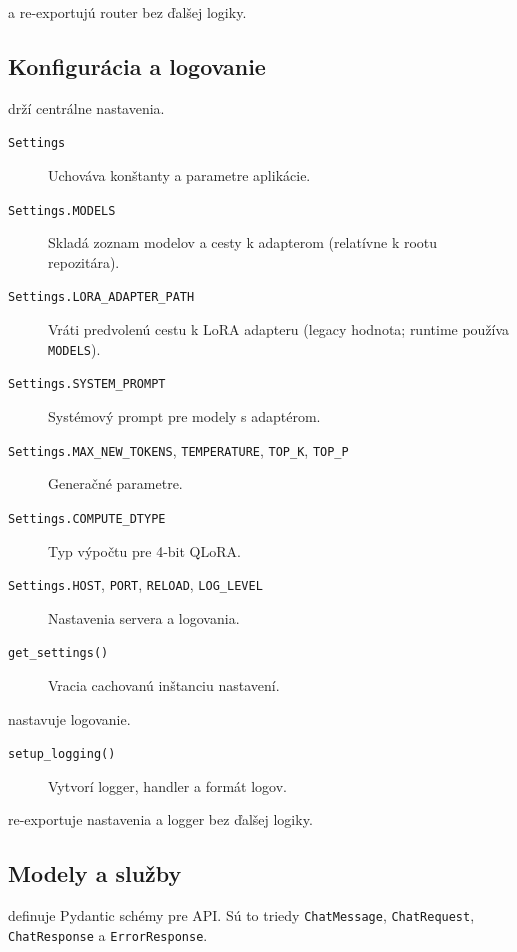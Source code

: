 \textbf{} a \textbf{} re-exportujú router bez ďalšej logiky.

\subsection{Konfigurácia a logovanie}

\textbf{} drží centrálne nastavenia.
\begin{description}
	\item[\texttt{Settings}] Uchováva konštanty a parametre aplikácie.
	\item[\texttt{Settings.MODELS}] Skladá zoznam modelov a cesty k adapterom (relatívne k rootu repozitára).
	\item[\texttt{Settings.LORA\_ADAPTER\_PATH}] Vráti predvolenú cestu k LoRA adapteru (legacy hodnota; runtime používa \texttt{MODELS}).
	\item[\texttt{Settings.SYSTEM\_PROMPT}] Systémový prompt pre modely s adaptérom.
	\item[\texttt{Settings.MAX\_NEW\_TOKENS}, \texttt{TEMPERATURE}, \texttt{TOP\_K}, \texttt{TOP\_P}] Generačné parametre.
	\item[\texttt{Settings.COMPUTE\_DTYPE}] Typ výpočtu pre 4-bit QLoRA.
	\item[\texttt{Settings.HOST}, \texttt{PORT}, \texttt{RELOAD}, \texttt{LOG\_LEVEL}] Nastavenia servera a logovania.
	\item[\texttt{get\_settings()}] Vracia cachovanú inštanciu nastavení.
\end{description}

\textbf{} nastavuje logovanie.
\begin{description}
	\item[\texttt{setup\_logging()}] Vytvorí logger, handler a formát logov.
\end{description}

\textbf{} re-exportuje nastavenia a logger bez ďalšej logiky.

\subsection{Modely a služby}

\textbf{} definuje Pydantic schémy pre API. Sú to triedy \texttt{ChatMessage}, \texttt{ChatRequest}, \texttt{ChatResponse} a \texttt{ErrorResponse}.

